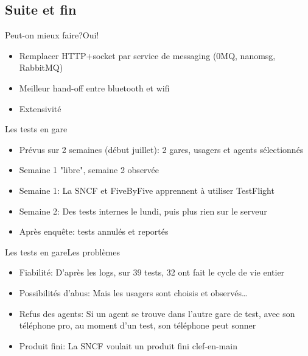 \documentclass{beamer}
\begin{document}
\subsection{Suite et fin}
\begin{frame}{Peut-on mieux faire?}{Oui!}
    \begin{itemize}
        \item Remplacer HTTP+socket par service de messaging (0MQ, nanomsg, RabbitMQ)
        \item Meilleur hand-off entre bluetooth et wifi
        \item Extensivité
    \end{itemize}
\end{frame}
\begin{frame}{Les tests en gare}
    \begin{itemize}
        \item Prévus sur 2 semaines (début juillet): 2 gares, usagers et agents sélectionnés
        \item Semaine 1 "libre", semaine 2 observée
        \item Semaine 1: La SNCF et FiveByFive apprennent à utiliser TestFlight
        \item Semaine 2: Des tests internes le lundi, puis plus rien sur le serveur\\
        \item Après enquête: tests annulés et reportés
    \end{itemize}
\end{frame}
\begin{frame}{Les tests en gare}{Les problèmes}
    \begin{itemize}
        \item Fiabilité: D'après les logs, sur 39 tests, 32 ont fait le cycle de vie entier
        \item Possibilités d'abus: Mais les usagers sont choisis et observés\dots
        \item Refus des agents: Si un agent se trouve dans l'autre gare de test, avec son téléphone pro, au moment d'un test, son téléphone peut sonner
        \item Produit fini: La SNCF voulait un produit fini clef-en-main
    \end{itemize}
\end{frame}
\end{document}
